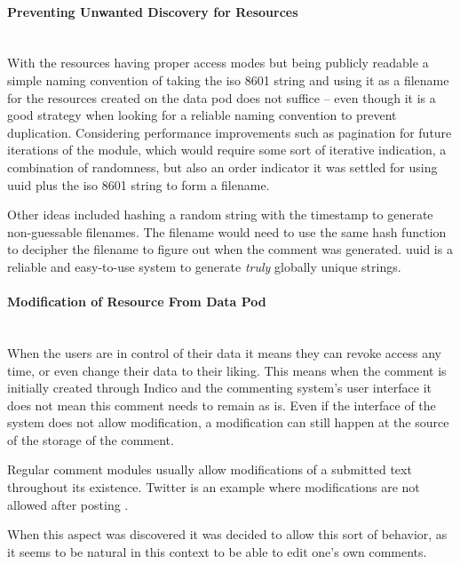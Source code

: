 \paragraph{Preventing Unwanted Discovery for Resources}\mbox{}\\

With the resources having proper access modes but being publicly readable a simple naming convention of taking the \gls{iso} 8601 string and using it as a filename for the resources created on the data pod does not suffice -- even though it is a good strategy when looking for a reliable naming convention to prevent duplication. Considering performance improvements such as pagination for future iterations of the module, which would require some sort of iterative indication, a combination of randomness, but also an order indicator it was settled for using \gls{uuid} plus the \gls{iso} 8601 string to form a filename.

Other ideas included hashing a random string with the timestamp to generate non-guessable filenames. The filename would need to use the same hash function to decipher the filename to figure out when the comment was generated. \gls{uuid} is a reliable and easy-to-use system to generate \textit{truly} globally unique strings. 
\vspace{0.5cm}
\paragraph{Modification of Resource From Data Pod}\mbox{}\\

When the users are in control of their data it means they can revoke access any time, or even change their data to their liking. This means when the comment is initially created through Indico and the commenting system's user interface it does not mean this comment needs to remain as is. Even if the interface of the system does not allow modification, a modification can still happen at the source of the storage of the comment.

Regular comment modules usually allow modifications of a submitted text throughout its existence. Twitter is an example where modifications are not allowed after posting \cite{twitter-edit}. 

When this aspect was discovered it was decided to allow this sort of behavior, as it seems to be natural in this context to be able to edit one's own comments.

\vspace{0.5cm}
